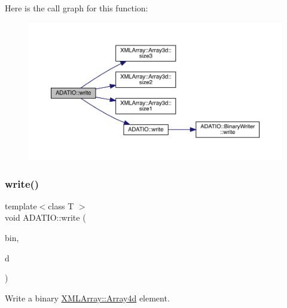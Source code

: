 Here is the call graph for this function\+:\nopagebreak
\begin{figure}[H]
\begin{center}
\leavevmode
\includegraphics[width=350pt]{d0/dba/namespaceADATIO_a7fbf1297a893fe12c3b03b9594408829_cgraph}
\end{center}
\end{figure}
\mbox{\label{namespaceADATIO_ad3c579901108d678f21ec1a97d0ab197}} 
\subsubsection{\texorpdfstring{write()}{write()}\hspace{0.1cm}{\footnotesize\ttfamily [19/25]}}
{\footnotesize\ttfamily template$<$class T $>$ \\
void A\+D\+A\+T\+I\+O\+::write (\begin{DoxyParamCaption}\item[{\mbox{\hyperlink{classADATIO_1_1BinaryWriter}{Binary\+Writer}} \&}]{bin,  }\item[{const \mbox{\hyperlink{classXMLArray_1_1Array4d}{X\+M\+L\+Array\+::\+Array4d}}$<$ T $>$ \&}]{d }\end{DoxyParamCaption})\hspace{0.3cm}{\ttfamily [inline]}}



Write a binary \mbox{\hyperlink{classXMLArray_1_1Array4d}{X\+M\+L\+Array\+::\+Array4d}} element. 

